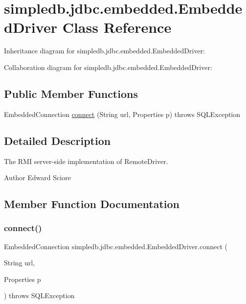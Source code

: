 \hypertarget{classsimpledb_1_1jdbc_1_1embedded_1_1EmbeddedDriver}{}\section{simpledb.\+jdbc.\+embedded.\+Embedded\+Driver Class Reference}
\label{classsimpledb_1_1jdbc_1_1embedded_1_1EmbeddedDriver}


Inheritance diagram for simpledb.\+jdbc.\+embedded.\+Embedded\+Driver\+:


Collaboration diagram for simpledb.\+jdbc.\+embedded.\+Embedded\+Driver\+:
\subsection*{Public Member Functions}
\begin{DoxyCompactItemize}
\item 
Embedded\+Connection \hyperlink{classsimpledb_1_1jdbc_1_1embedded_1_1EmbeddedDriver_a5dbd5f1a04a8d94aa4cbfc804d997f0a}{connect} (String url, Properties p)  throws S\+Q\+L\+Exception 
\end{DoxyCompactItemize}


\subsection{Detailed Description}
The R\+MI server-\/side implementation of Remote\+Driver. \begin{DoxyAuthor}{Author}
Edward Sciore 
\end{DoxyAuthor}


\subsection{Member Function Documentation}
\mbox{\label{classsimpledb_1_1jdbc_1_1embedded_1_1EmbeddedDriver_a5dbd5f1a04a8d94aa4cbfc804d997f0a}} 
\subsubsection{\texorpdfstring{connect()}{connect()}}
{\footnotesize\ttfamily Embedded\+Connection simpledb.\+jdbc.\+embedded.\+Embedded\+Driver.\+connect (\begin{DoxyParamCaption}\item[{String}]{url,  }\item[{Properties}]{p }\end{DoxyParamCaption}) throws S\+Q\+L\+Exception\hspace{0.3cm}{\ttfamily [inline]}}


